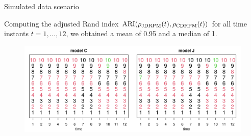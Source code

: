 \documentclass[
	11pt, %
 xcolor={dvipsnames,svgnames}
]{beamer}
\begin{document}
\begin{frame}{Simulated data scenario}

 Computing the adjusted Rand index $\operatorname{ARI}(\rho_{\text{JDRPM}}(t),\rho_{\text{CDRPM}}(t))$ for all time instants $t=1,\ldots,12$, we obtained a \alert{mean of 0.95} and a \alert{median of 1}.
    \begin{figure}[!htb]
    \centering
    \includegraphics[width=1\linewidth]{Testing/Assessing correctness/no space/partizioni_nums.pdf}
    \label{fig:partizioni no space}
\end{figure}
\end{frame}


\end{document}
